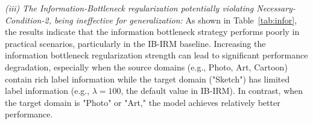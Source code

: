 \begin{table}[h!]
\vspace{-5mm}
\caption{Classification accuracy on PACS using ResNet-50 with varying information bottleneck coefficient $\lambda$.}
\begin{centering}
\par\end{centering}
\label{tab:infor}
\vspace{-2mm}
\end{table}
\textit{(iii) The Information-Bottleneck regularization potentially violating Necessary-Condition-2, being ineffective for generalization:}  As shown in Table~\ref{tab:infor}, the results indicate that the information bottleneck strategy performs poorly in practical scenarios, particularly in the IB-IRM baseline. Increasing the information bottleneck regularization strength can lead to significant performance degradation, especially when the source domains (e.g., Photo, Art, Cartoon) contain rich label information while the target domain ("Sketch") has limited label information (e.g., $\lambda=100$, the default value in IB-IRM). In contrast, when the target domain is "Photo" or "Art," the model achieves relatively better performance.
\vspace{-1mm}






